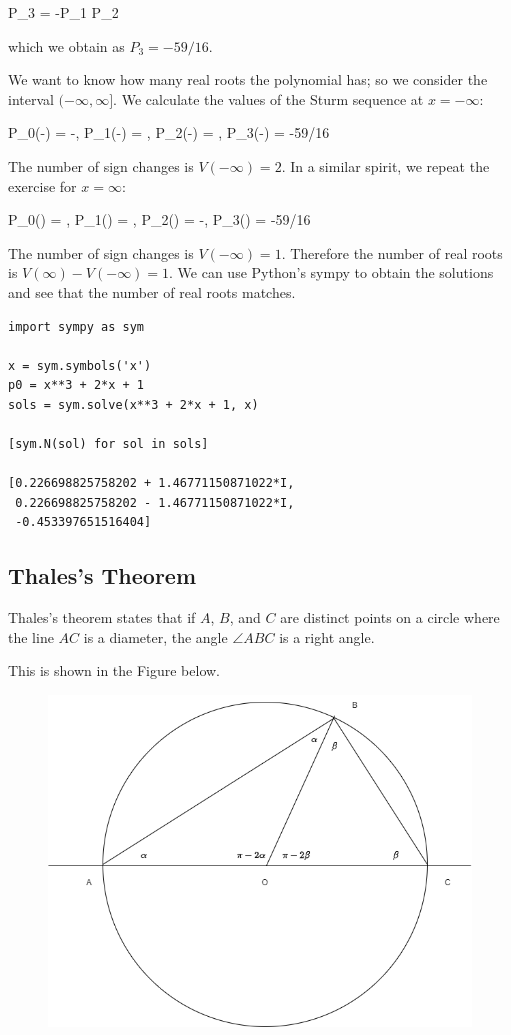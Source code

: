 \bee
P_3 = -P_1 \mod P_2
\eee

which we obtain as $P_3 = - 59/16$.

We want to know how many real roots the polynomial has; so we consider the interval $(-\infty, \infty]$. We calculate the values of the Sturm sequence at $x = -\infty$:

\bee
P_0(-\infty) = -\infty, P_1(-\infty) = \infty, P_2(-\infty) = \infty, P_3(-\infty) = -59/16
\eee

The number of sign changes is $V(-\infty) = 2$. In a similar spirit, we repeat the exercise for $x = \infty$:

\bee
P_0(\infty) = \infty, P_1(\infty) = \infty, P_2(\infty) = -\infty, P_3(\infty) = -59/16
\eee

The number of sign changes is $V(-\infty) = 1$. Therefore the number of real roots is $V(\infty) - V(-\infty) = 1$. We can use Python's sympy to obtain the solutions and see that the number of real roots matches.

\begin{verbatim}
import sympy as sym

x = sym.symbols('x')
p0 = x**3 + 2*x + 1
sols = sym.solve(x**3 + 2*x + 1, x)

[sym.N(sol) for sol in sols]

[0.226698825758202 + 1.46771150871022*I,
 0.226698825758202 - 1.46771150871022*I,
 -0.453397651516404]
\end{verbatim}


\subsection{Thales's Theorem}

Thales's theorem states that if $A$, $B$, and $C$ are distinct points on a circle where the line $AC$ is a diameter, the angle $\angle ABC$ is a right angle.

This is shown in the Figure below.

\begin{figure}[H]
    \centering
    \includegraphics[scale=0.5]{images/2023-09-26-thales_01.png}
\end{figure}

